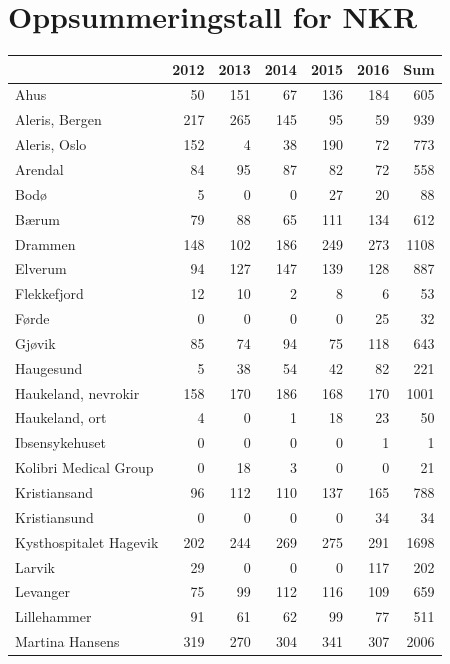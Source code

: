 \documentclass [norsk,a4paper,twoside]{article}\usepackage[]{graphicx}\usepackage[]{color}
\begin{document}
\section{Oppsummeringstall for NKR}

\begin{table}[ht]
\centering
\begin{tabular}{lrrrrrr}
  \hline
 & 2012 & 2013 & 2014 & 2015 & 2016 & Sum \\ 
  \hline
Ahus & 50 & 151 & 67 & 136 & 184 & 605 \\ 
  Aleris, Bergen & 217 & 265 & 145 & 95 & 59 & 939 \\ 
  Aleris, Oslo & 152 & 4 & 38 & 190 & 72 & 773 \\ 
  Arendal & 84 & 95 & 87 & 82 & 72 & 558 \\ 
  Bodø & 5 & 0 & 0 & 27 & 20 & 88 \\ 
  Bærum & 79 & 88 & 65 & 111 & 134 & 612 \\ 
  Drammen & 148 & 102 & 186 & 249 & 273 & 1108 \\ 
  Elverum & 94 & 127 & 147 & 139 & 128 & 887 \\ 
  Flekkefjord & 12 & 10 & 2 & 8 & 6 & 53 \\ 
  Førde & 0 & 0 & 0 & 0 & 25 & 32 \\ 
  Gjøvik & 85 & 74 & 94 & 75 & 118 & 643 \\ 
  Haugesund & 5 & 38 & 54 & 42 & 82 & 221 \\ 
  Haukeland, nevrokir & 158 & 170 & 186 & 168 & 170 & 1001 \\ 
  Haukeland, ort & 4 & 0 & 1 & 18 & 23 & 50 \\ 
  Ibsensykehuset & 0 & 0 & 0 & 0 & 1 & 1 \\ 
  Kolibri Medical Group & 0 & 18 & 3 & 0 & 0 & 21 \\ 
  Kristiansand & 96 & 112 & 110 & 137 & 165 & 788 \\ 
  Kristiansund & 0 & 0 & 0 & 0 & 34 & 34 \\ 
  Kysthospitalet Hagevik & 202 & 244 & 269 & 275 & 291 & 1698 \\ 
  Larvik & 29 & 0 & 0 & 0 & 117 & 202 \\ 
  Levanger & 75 & 99 & 112 & 116 & 109 & 659 \\ 
  Lillehammer & 91 & 61 & 62 & 99 & 77 & 511 \\ 
  Martina Hansens & 319 & 270 & 304 & 341 & 307 & 2006 \\ 

\end{tabular}
\end{table}
\end{document}
